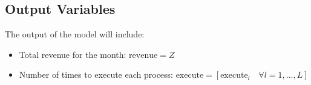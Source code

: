 \documentclass{article}
\begin{document}
\subsection*{Output Variables}
The output of the model will include:
\begin{itemize}
    \item Total revenue for the month: \( \text{revenue} = Z \)
    \item Number of times to execute each process: \( \text{execute} = [\text{execute}_l \quad \forall l = 1, \ldots, L] \)
\end{itemize}
\end{document}
